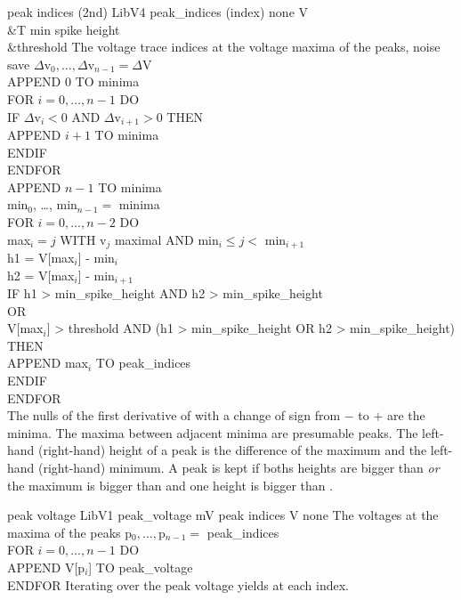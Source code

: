 \begin{efeature}
  {peak indices (2nd)}
  {LibV4}
  {peak\_indices}
  {(index)}
  {none}
  {V\\&T}
  {min spike height\\&threshold}
  {The voltage trace indices at the voltage maxima of the peaks, noise save}
  {
  $\Delta$v$_0, \ldots, \Delta$v$_{n-1} = \Delta$V \\
  APPEND $0$ TO minima \\
  FOR $i = 0, \dots, n - 1$ DO \+ \\
    IF $\Delta$v$_i < 0$ AND $\Delta$v$_{i+1} > 0$ THEN \+ \\
      APPEND $i + 1$ TO minima \- \\
    ENDIF \- \\
  ENDFOR \\
  APPEND $n - 1$ TO minima \\
  min$_0$, \ldots, min$_{n-1} =$ minima \\
  FOR $i = 0, \dots, n - 2$ DO \+ \\
    max$_i = j$ WITH v$_j$ maximal AND min$_i \le j < $ min$_{i+1}$ \\
    h1 = V[max$_i$] - min$_i$ \\
    h2 = V[max$_i$] - min$_{i+1}$ \\
    IF h1 > min\_spike\_height AND h2 > min\_spike\_height \\
    OR \\
    V[max$_i$] > threshold AND (h1 > min\_spike\_height OR h2 > min\_spike\_height) THEN \+ \\
      APPEND max$_i$ TO peak\_indices \- \\
    ENDIF \- \\
  ENDFOR \\
  }
  The nulls of the first derivative of  with a change of sign from $-$ to $+$ are the minima.
  The maxima between adjacent minima are presumable peaks.
  The left-hand (right-hand) height of a peak is the difference of the maximum and the left-hand (right-hand) minimum.
  A peak is kept if boths heights are bigger than  \emph{or} the maximum is bigger than  and one height is bigger than .
\end{efeature}

\begin{efeature}
  {peak voltage}
  {LibV1}
  {peak\_voltage}
  {mV}
  {peak indices}
  {V}
  {none}
  {The voltages at the maxima of the peaks}
  {
  p$_0, \ldots, $p$_{n-1} =$ peak\_indices \\
  FOR $i = 0, \dots, n - 1$ DO \+ \\
    APPEND V[p$_i$] TO peak\_voltage \- \\
  ENDFOR
  }
  Iterating over the  peak voltage yields  at each index.
  
\end{efeature}

